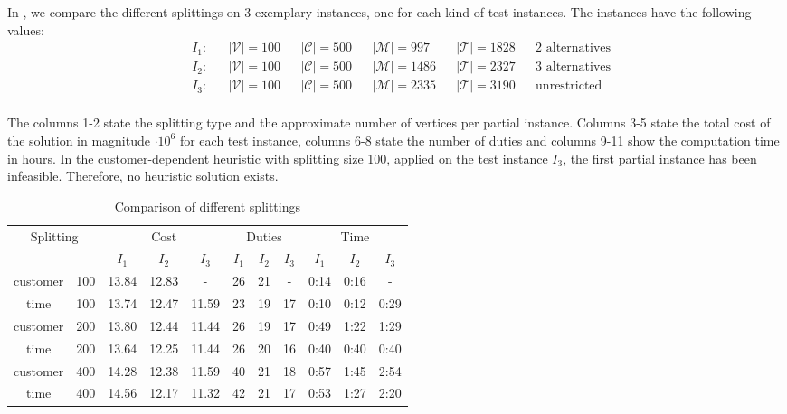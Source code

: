 In , we compare the different splittings on 3 exemplary instances, one for each kind of test instances. The instances have the following values:
\begin{align*}
	& I_1: && \vert\mathcal{V}\vert = 100 && \vert\mathcal{C}\vert = 500 && \vert\mathcal{M}\vert = 997 && \vert\mathcal{T}\vert = 1828 && 2 \text{ alternatives} \\
	& I_2: && \vert\mathcal{V}\vert = 100 && \vert\mathcal{C}\vert = 500 && \vert\mathcal{M}\vert = 1486 && \vert\mathcal{T}\vert = 2327 && 3 \text{ alternatives} \\
	& I_3: && \vert\mathcal{V}\vert = 100 && \vert\mathcal{C}\vert = 500 && \vert\mathcal{M}\vert = 2335 && \vert\mathcal{T}\vert = 3190 && \text{unrestricted} \\
\end{align*}

The columns 1-2 state the splitting type and the approximate number of vertices per partial instance. Columns 3-5 state the total cost of the solution in magnitude $\cdot 10^6$ for each test instance, columns 6-8 state the number of duties and columns 9-11 show the computation time in hours. In the customer-dependent heuristic with splitting size 100, applied on the test instance $I_3$, the first partial instance has been infeasible. Therefore, no heuristic solution exists.

\begin{table}[htb]
	\centering
	\begin{tabular}{cc|ccc|ccc|ccc}
		\toprule
		\multicolumn{2}{c}{Splitting} & \multicolumn{3}{c}{Cost} & \multicolumn{3}{c}{Duties} & \multicolumn{3}{c}{Time} \\
		\cmidrule(r){3-11}
		&& $I_1$ & $I_2$ & $I_3$ & $I_1$ & $I_2$ & $I_3$ & $I_1$ & $I_2$ & $I_3$ \\
		\midrule
		customer & 100  &  13.84 & 12.83 &   -    &  26 & 21 & -   &  0:14 & 0:16 &  -   \\
		time     & 100  &  13.74 & 12.47 & 11.59  &  23 & 19 & 17  &  0:10 & 0:12 & 0:29 \\
		customer & 200  &  13.80 & 12.44 & 11.44  &  26 & 19 & 17  &  0:49 & 1:22 & 1:29 \\
		time     & 200  &  13.64 & 12.25 & 11.44  &  26 & 20 & 16  &  0:40 & 0:40 & 0:40 \\
		customer & 400  &  14.28 & 12.38 & 11.59  &  40 & 21 & 18  &  0:57 & 1:45 & 2:54 \\
		time     & 400  &  14.56 & 12.17 & 11.32  &  42 & 21 & 17  &  0:53 & 1:27 & 2:20 \\
		\bottomrule
	\end{tabular}
	\caption{Comparison of different splittings}
	\label{tab:results:splittings}
\end{table}

